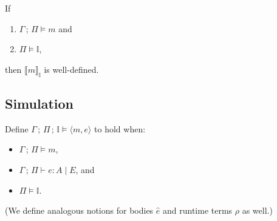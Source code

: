 \documentclass{article}
\newcommand{\semi}{\,;\,}
\newcommand{\llrr}[1]{\llbracket #1 \rrbracket}
\newcommand{\pair}[2]{\langle #1, #2 \rangle}
\newcommand{\I}{\mathbb{I}}
\begin{document}
\begin{corollary}
If \begin{enumerate}[label=(\roman*)]
\item $\Gamma \semi \Pi \vDash m$ and
\item $\Pi \vDash \I$,
\end{enumerate}
then $\llrr{m}_\I$ is well-defined.
\end{corollary}

\subsection{Simulation}

Define $\Gamma \semi \Pi \semi \I \vDash \pair{m}{e}$
to hold when:
\begin{itemize}
\item $\Gamma \semi \Pi \vDash m$,
\item $\Gamma \semi \Pi \vdash e: A \mid E$, and
\item $\Pi \vDash \I$.
\end{itemize}
(We define analogous notions for bodies $\hat{e}$ and runtime terms $\rho$
as well.)
\end{document}
